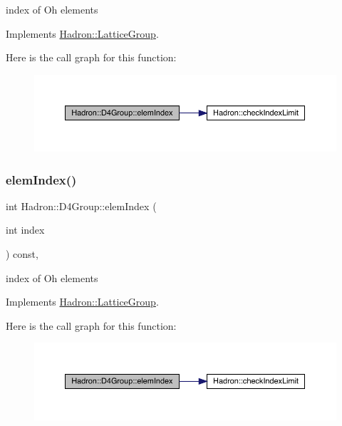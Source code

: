 index of Oh elements 

Implements \mbox{\hyperlink{structHadron_1_1LatticeGroup_afb8e3ee60de059f75bce1044c694e1e8}{Hadron\+::\+Lattice\+Group}}.

Here is the call graph for this function\+:
\nopagebreak
\begin{figure}[H]
\begin{center}
\leavevmode
\includegraphics[width=350pt]{de/d5e/structHadron_1_1D4Group_aa4ca8a3f1bc6774b630cd6a354179298_cgraph}
\end{center}
\end{figure}
\mbox{\label{structHadron_1_1D4Group_aa4ca8a3f1bc6774b630cd6a354179298}} 
\subsubsection{\texorpdfstring{elemIndex()}{elemIndex()}\hspace{0.1cm}{\footnotesize\ttfamily [3/3]}}
{\footnotesize\ttfamily int Hadron\+::\+D4\+Group\+::elem\+Index (\begin{DoxyParamCaption}\item[{int}]{index }\end{DoxyParamCaption}) const\hspace{0.3cm}{\ttfamily [inline]}, {\ttfamily [virtual]}}

index of Oh elements 

Implements \mbox{\hyperlink{structHadron_1_1LatticeGroup_afb8e3ee60de059f75bce1044c694e1e8}{Hadron\+::\+Lattice\+Group}}.

Here is the call graph for this function\+:
\nopagebreak
\begin{figure}[H]
\begin{center}
\leavevmode
\includegraphics[width=350pt]{de/d5e/structHadron_1_1D4Group_aa4ca8a3f1bc6774b630cd6a354179298_cgraph}
\end{center}
\end{figure}
\mbox{\label{structHadron_1_1D4Group_ae6c08a58023532bcf277f60c1dddde4f}} 
